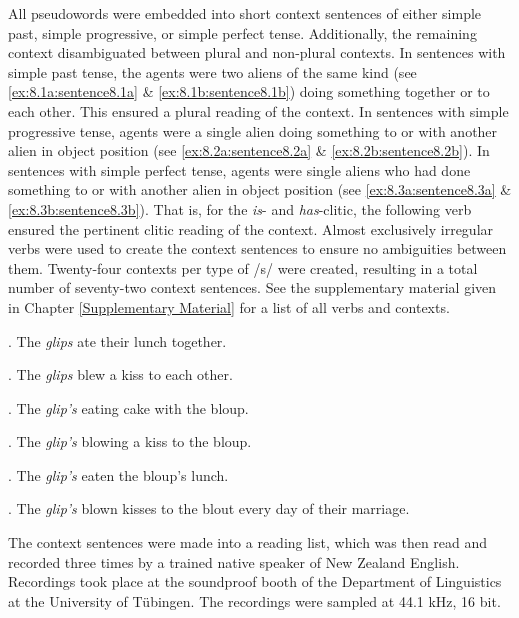 All pseudowords were embedded into short context sentences of either simple past, simple progressive, or simple perfect tense. Additionally, the remaining context disambiguated between plural and non-plural contexts. In sentences with simple past tense, the agents were two aliens of the same kind (see \ref{ex:8.1a:sentence8.1a} \& \ref{ex:8.1b:sentence8.1b}) doing something together or to each other. This ensured a plural reading of the context. In sentences with simple progressive tense, agents were a single alien doing something to or with another alien in object position (see \ref{ex:8.2a:sentence8.2a} \& \ref{ex:8.2b:sentence8.2b}). In sentences with simple perfect tense, agents were single aliens who had done something to or with another alien in object position (see \ref{ex:8.3a:sentence8.3a} \& \ref{ex:8.3b:sentence8.3b}). That is, for the \textit{is}- and \textit{has}-clitic, the following verb ensured the pertinent clitic reading of the context. Almost exclusively irregular verbs were used to create the context sentences to ensure no ambiguities between them. Twenty-four contexts per type of /s/ were created, resulting in a total number of seventy-two context sentences. See the supplementary material given in Chapter \ref{Supplementary Material} for a list of all verbs and contexts.

\ex.
\label{ex:8.1a:sentence8.1a}
	The \textit{glips} ate their lunch together.
	
\ex.
\label{ex:8.1b:sentence8.1b}
	The \textit{glips} blew a kiss to each other.

\ex.
\label{ex:8.2a:sentence8.2a}
	The \textit{glip’s} eating cake with the bloup. 

\ex.
\label{ex:8.2b:sentence8.2b}
	The \textit{glip’s} blowing a kiss to the bloup.
	
\ex.
\label{ex:8.3a:sentence8.3a}
    The \textit{glip’s} eaten the bloup’s lunch.
	
\ex.
\label{ex:8.3b:sentence8.3b}
	The \textit{glip’s} blown kisses to the blout every day of their marriage.

The context sentences were made into a reading list, which was then read and recorded three times by a trained native speaker of New Zealand English. Recordings took place at the soundproof booth of the Department of Linguistics at the University of Tübingen. The recordings were sampled at 44.1 kHz, 16 bit.


